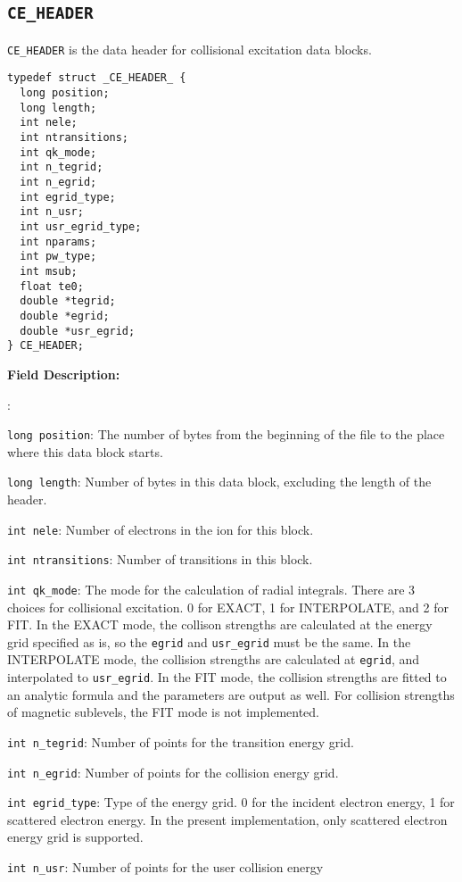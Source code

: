 \documentclass[twoside,letterpaper]{refrep}
\newenvironment{dbdesc}{\textbf{Field Description:} \begin{list}
	{:}{\setlength{\labelwidth}{2in}
	   \setlength{\leftmargin}{2in}
	   \setlength{\labelsep}{0.1in}
	   \setlength{\rightmargin}{0.2in}}}
	{\end{list}}
\begin{document}
\subsection{\texttt{CE\_HEADER}}
\texttt{CE\_HEADER} is the data header for collisional excitation data blocks.

\begin{verbatim}
typedef struct _CE_HEADER_ {
  long position;
  long length;
  int nele;
  int ntransitions;
  int qk_mode;
  int n_tegrid;
  int n_egrid;
  int egrid_type;
  int n_usr;
  int usr_egrid_type;
  int nparams;
  int pw_type;
  int msub;
  float te0;
  double *tegrid;
  double *egrid;
  double *usr_egrid;
} CE_HEADER;
\end{verbatim}

\begin{dbdesc}
\item[\texttt{long position}:] The number of bytes from the beginning of the
file to the place where this data block starts.
\item[\texttt{long length}:] Number of bytes in this data block, excluding the
length of the header.
\item[\texttt{int nele}:] Number of electrons in the ion for this block.
\item[\texttt{int ntransitions}:] Number of transitions in this block.
\item[\texttt{int qk\_mode}:] The mode for the calculation of radial
integrals. There are 3 choices for collisional excitation. 0 for EXACT, 1 for
INTERPOLATE, and 2 for FIT. In the EXACT mode, the collison strengths are
calculated at the energy grid specified as is, so the \texttt{egrid} and
\texttt{usr\_egrid} must be the same. In the INTERPOLATE mode, the collision
strengths are calculated at \texttt{egrid}, and interpolated to
\texttt{usr\_egrid}. In the FIT mode, the collision strengths are fitted to an
analytic formula and the parameters are output as well. For collision
strengths of magnetic sublevels, the FIT mode is not implemented.
\item[\texttt{int n\_tegrid}:] Number of points for the transition energy grid.
\item[\texttt{int n\_egrid}:] Number of points for the collision energy grid.
\item[\texttt{int egrid\_type}:] Type of the energy grid. 0 for the incident
electron energy, 1 for scattered electron energy. In the present
implementation, only scattered electron energy grid is supported.
\item[\texttt{int n\_usr}:] Number of points for the user collision energy

\end{dbdesc}
\end{document}
